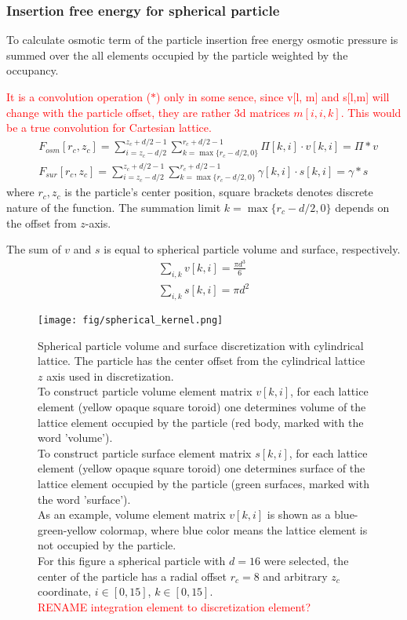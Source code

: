 \documentclass[12pt, a4paper]{article}
\newcommand\todo[1]{\textcolor{red}{#1}}
\begin{document}
\subsubsection{Insertion free energy for spherical particle}
To calculate osmotic term of the particle insertion free energy osmotic pressure is summed over the all elements occupied by the particle weighted by the occupancy. 

\todo{It is a convolution operation ($\ast$) only in some sence, since v[l, m] and s[l,m] will change with the particle offset, they are rather 3d matrices $m[i,i,k]$.
This would be a true convolution for Cartesian lattice.}
\begin{align}
    &F_{osm}[r_c, z_c] = \sum_{i=z_c-d/2}^{z_c+d/2-1} \sum_{k=\max\{r_c-d/2, 0\}}^{r_c+d/2-1} \Pi[k,i] \cdot v[k,i] = \Pi \ast v
    \\
    &F_{sur}[r_c, z_c] = \sum_{i=z_c-d/2}^{z_c+d/2-1} \sum_{k=\max\{r_c-d/2, 0\}}^{r_c+d/2-1} \gamma[k,i] \cdot s[k,i] = \gamma \ast s
\end{align}
where $r_c, z_c$ is the particle's center position, square brackets denotes discrete nature of the function.
The summation limit ${k=\max\{r_c-d/2, 0\}}$ depends on the offset from $z$-axis.


The sum of $v$ and $s$ is equal to spherical particle volume and surface, respectively.
\begin{eqnarray}
    \sum_{i,k} v[k,i] = \frac{\pi d^{3}}{6}
    \\
    \sum_{i,k} s[k,i] = \pi d^{2}
\end{eqnarray}

\begin{figure}
    \centering
    \texttt{[image: fig/spherical\_kernel.png]}
    \caption{
        Spherical particle volume and surface discretization with cylindrical lattice.
        The particle has the center offset from the cylindrical lattice $z$ axis used in discretization.
        \\
        To construct particle volume element matrix $v[k,i]$, for each lattice element (yellow opaque square toroid) one determines volume of the lattice element occupied by the particle (red body, marked with the word 'volume').
        \\
        To construct particle surface element matrix $s[k,i]$, for each lattice element (yellow opaque square toroid) one determines surface of the lattice element occupied by the particle (green surfaces, marked with the word 'surface').
        \\
        As an example, volume element matrix $v[k,i]$ is shown as a blue-green-yellow colormap, 
        where blue color means the lattice element is not occupied by the particle.
        \\
        For this figure a spherical particle with $d=16$ were selected, the center of the particle has a radial offset $r_c=8$ and arbitrary $z_c$ coordinate,
        $i \in [0,15]$, $k \in [0,15]$.
        \\
        \todo{RENAME integration element to discretization element?}
    }
    \label{fig:spherical_kernel}
\end{figure}


\printbibliography
\end{document}
